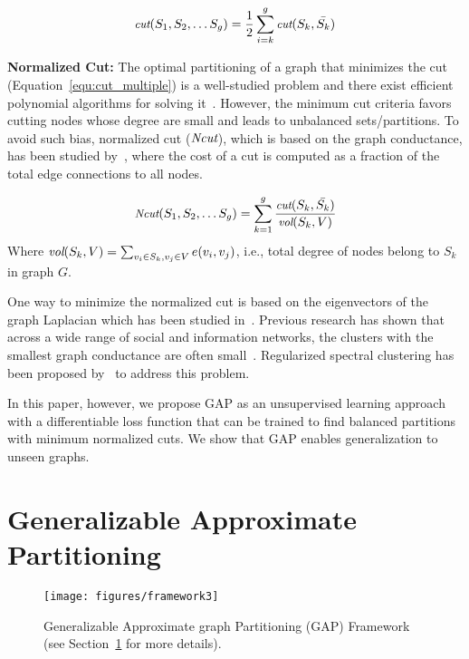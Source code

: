 \documentclass[10pt,twocolumn]{article}
\begin{document}
\begin{equation} \label{equ:cut_multiple}
\small
 \emph{cut}(S_1, S_2, \dots S_g) = \frac{1}{2}\sum_{i=k}^{g} \emph{cut}(S_k, \bar{S_k})
\end{equation}

\noindent\textbf{Normalized Cut:}
The optimal partitioning of a graph that minimizes the cut (Equation~\ref{equ:cut_multiple}) is a well-studied problem and there exist efficient polynomial algorithms for solving it~\cite{Papadimitriou_1982}. However, the minimum cut criteria favors cutting nodes whose degree are small and leads to unbalanced sets/partitions.
To avoid such bias, normalized cut ($\emph{Ncut}$), which is based on the graph conductance, has been studied by~\cite{Shi_2000, ZhangR18}, where the cost of a cut is computed as a fraction of the total edge connections to all nodes.

\begin{equation} \label{equ:Ncut}
\small
 \emph{Ncut}(S_1, S_2, \dots S_g) = \sum_{k=1}^{g} \frac{\emph{cut}(S_k, \bar{S_k})}{\emph{vol}(S_k, V)}
\end{equation}
Where $\emph{vol}(S_k, V) = \sum_{v_i\in S_k, v_j\in V} e(v_i,v_j)$, i.e., total degree of nodes belong to $S_k$ in graph $G$. 

One way to minimize the normalized cut is based on the eigenvectors of the graph Laplacian which has been studied in~\cite{Shi_2000, ZhangR18}. Previous research has shown that across a wide range of social and information networks, the clusters with the smallest graph conductance are often small~\cite{LeskovecLDM09, ZhangR18}. Regularized spectral clustering has been proposed by~\cite{ZhangR18} to address this problem.


In this paper, however, we propose GAP as an unsupervised learning approach with a differentiable loss function that can be trained to find balanced partitions with minimum normalized cuts. We show that GAP enables generalization to unseen graphs. 

%
 \section{Generalizable Approximate Partitioning}
\label{sec:tech}

\begin{figure*}[h]
\centering
\texttt{[image: figures/framework3]}
\caption{Generalizable Approximate graph Partitioning (GAP) Framework (see Section~\ref{sec:tech} for more details).}
\label{fig:framework}
\end{figure*}
\end{document}
